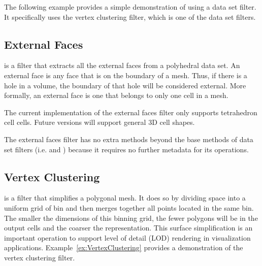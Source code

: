 The following example provides a simple demonstration of using a data set
filter. It specifically uses the vertex clustering filter, which is one of
the data set filters.


\subsection{External Faces}


 is a filter that extracts all the external faces
from a polyhedral data set. An external face is any face that is on the
boundary of a mesh. Thus, if there is a hole in a volume, the boundary of
that hole will be considered external. More formally, an external face is
one that belongs to only one cell in a mesh.

\begin{commonerrors}
  The current implementation of the external faces filter only supports
  tetrahedron cell cells. Future versions will support general 3D cell
  shapes. 
\end{commonerrors}

The external faces filter has no extra methods beyond the base methods of
data set filters (i.e.  and
) because it requires no further metadata for
its operations.



\subsection{Vertex Clustering}


 is a filter that simplifies a polygonal mesh.
It does so by dividing space into a uniform grid of bin and then merges
together all points located in the same bin. The smaller the dimensions of
this binning grid, the fewer polygons will be in the output cells and the
coarser the representation. This surface simplification is an important
operation to support level of detail (LOD)
rendering in visualization applications. Example~\ref{ex:VertexClustering}
provides a demonstration of the vertex clustering filter.

